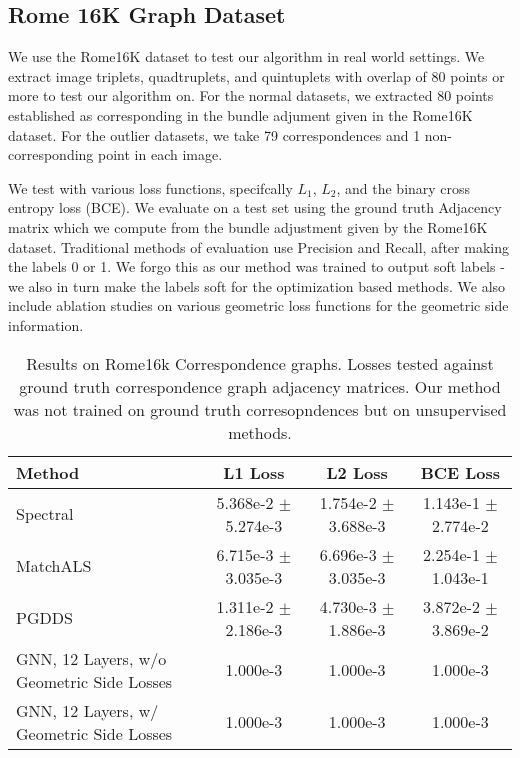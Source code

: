\documentclass[10pt,twocolumn,letterpaper]{article}
\begin{document}
\subsection{Rome 16K Graph Dataset}
We  use the Rome16K dataset \cite{li2010location} to test our algorithm in real world settings.
We extract image triplets, quadtruplets, and quintuplets with overlap of 80 points or more to test our algorithm on. For the normal datasets, we extracted 80 points established as corresponding in the bundle adjument given in the Rome16K dataset. For the outlier datasets, we take 79 correspondences and 1 non-corresponding point in each image.

We test with various loss functions, specifcally $L_1$, $L_2$, and the binary cross entropy loss (BCE).
We evaluate on a test set using the ground truth Adjacency matrix which we compute from the bundle adjustment given by the Rome16K dataset.
Traditional methods of evaluation use Precision and Recall, after making the labels 0 or 1.
We forgo this as our method was trained to output soft labels - we also in turn make the labels soft for the optimization based methods.
We also include ablation studies on various geometric loss functions for the geometric side information.


\begin{table*}
\begin{center}
\begin{tabular}{|l|c|c|c|}
\hline
Method                                    & L1 Loss                 & L2 Loss                 & BCE Loss \\
\hline\hline\hline
Spectral                                  & 5.368e-2 $\pm$ 5.274e-3 & 1.754e-2 $\pm$ 3.688e-3 & 1.143e-1 $\pm$ 2.774e-2 \\ \hline
MatchALS                                  & 6.715e-3 $\pm$ 3.035e-3 & 6.696e-3 $\pm$ 3.035e-3 & 2.254e-1 $\pm$ 1.043e-1 \\ \hline
PGDDS                                     & 1.311e-2 $\pm$ 2.186e-3 & 4.730e-3 $\pm$ 1.886e-3 & 3.872e-2 $\pm$ 3.869e-2 \\ \hline
GNN, 12 Layers, w/o Geometric Side Losses & 1.000e-3 & 1.000e-3 & 1.000e-3 \\ \hline
GNN, 12 Layers, w/ Geometric Side Losses  & 1.000e-3 & 1.000e-3 & 1.000e-3 \\ \hline
\hline
\end{tabular}
\end{center}
\caption{
Results on Rome16k Correspondence graphs.
Losses tested against ground truth correspondence graph adjacency matrices.
Our method was not trained on ground truth corresopndences but on unsupervised methods.
}
\end{table*}
\end{document}
